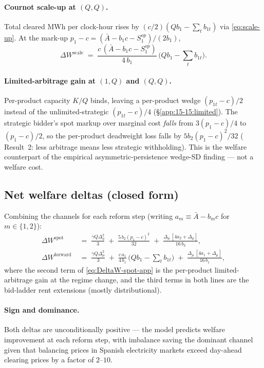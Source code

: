 \documentclass[11pt]{article}
\begin{document}
\paragraph{Cournot scale-up at $(Q,Q)$.} Total cleared MWh per clock-hour rises by $(c/2)(Q b_1 - \sum_t b_{1t})$ via \eqref{eq:scale-up}. At the mark-up $p_1 - c = (\bar A - b_1 c - S^{op}_1)/(2 b_1)$,
\begin{equation}
\Delta W^{\text{scale}} \;=\; \frac{c\,(\bar A - b_1 c - S^{op}_1)}{4\, b_1}\,\Big(Q b_1 - \sum_t b_{1t}\Big).
\label{eq:scaleup-welfare-app}
\end{equation}

\paragraph{Limited-arbitrage gain at $(1,Q)$ and $(Q,Q)$.} Per-product capacity $K/Q$ binds, leaving a per-product wedge $(p_{1t}-c)/2$ instead of the unlimited-strategic $(p_{1t}-c)/4$ (\S\ref{app:15-15:limited}). The strategic bidder's spot markup over marginal cost \emph{falls} from $3(p_1-c)/4$ to $(p_1-c)/2$, so the per-product deadweight loss falls by $5 b_2(p_1-c)^2/32$ (\citet{ito_reguant_2016} Result~2: less arbitrage means less strategic withholding). This is the welfare counterpart of the empirical asymmetric-persistence wedge-SD finding --- not a welfare cost.

\subsection{Net welfare deltas (closed form)}\label{app:welfare:deltas}

Combining the channels for each reform step (writing $a_m \equiv \bar A - b_m c$ for $m \in \{1, 2\}$):
\begin{align}
\Delta W^{\text{spot}} \;&=\; \frac{\gamma Q \Delta_\eta^2}{3} \;+\; \frac{5\, b_2 (p_1-c)^2}{32} \;+\; \frac{\Delta_\mu\,[4 a_2 + \Delta_\mu]}{16\, b_2}, \label{eq:DeltaW-spot-app}\\
\Delta W^{\text{forward}} \;&=\; \frac{\gamma Q \Delta_\mu^2}{3} \;+\; \frac{c\, a_1}{4\, b_1}\,\Big(Q b_1 - \!\sum_t b_{1t}\Big) \;+\; \frac{\Delta_\mu\,[4 a_1 + \Delta_\mu]}{16\, b_1}, \label{eq:DeltaW-fwd-app}
\end{align}
where the second term of \eqref{eq:DeltaW-spot-app} is the per-product limited-arbitrage gain at the regime change, and the third terms in both lines are the bid-ladder rent extensions (mostly distributional).

\paragraph{Sign and dominance.} Both deltas are unconditionally positive --- the model predicts welfare improvement at each reform step, with imbalance saving the dominant channel given that balancing prices in Spanish electricity markets exceed day-ahead clearing prices by a factor of $2$--$10$.
\end{document}
